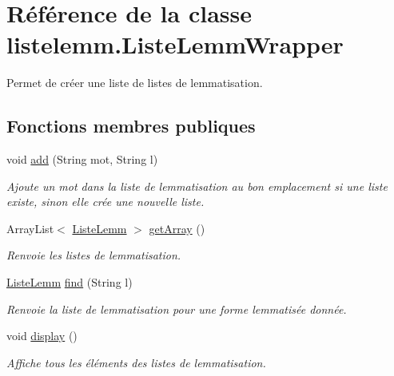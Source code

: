 \hypertarget{classlistelemm_1_1_liste_lemm_wrapper}{}\section{Référence de la classe listelemm.\+Liste\+Lemm\+Wrapper}
\label{classlistelemm_1_1_liste_lemm_wrapper}


Permet de créer une liste de listes de lemmatisation.  


\subsection*{Fonctions membres publiques}
\begin{DoxyCompactItemize}
\item 
void \hyperlink{classlistelemm_1_1_liste_lemm_wrapper_a35b6b38c162b228b18588b1bca8d7032}{add} (String mot, String l)
\begin{DoxyCompactList}\small\item\em Ajoute un mot dans la liste de lemmatisation au bon emplacement si une liste existe, sinon elle crée une nouvelle liste. \end{DoxyCompactList}\item 
Array\+List$<$ \hyperlink{classlistelemm_1_1_liste_lemm}{Liste\+Lemm} $>$ \hyperlink{classlistelemm_1_1_liste_lemm_wrapper_a51d4f2820d3582fbbe7f64581cb746dc}{get\+Array} ()
\begin{DoxyCompactList}\small\item\em Renvoie les listes de lemmatisation. \end{DoxyCompactList}\item 
\hyperlink{classlistelemm_1_1_liste_lemm}{Liste\+Lemm} \hyperlink{classlistelemm_1_1_liste_lemm_wrapper_a318131112339d774b21df28dd4d3872f}{find} (String l)
\begin{DoxyCompactList}\small\item\em Renvoie la liste de lemmatisation pour une forme lemmatisée donnée. \end{DoxyCompactList}\item 
void \hyperlink{classlistelemm_1_1_liste_lemm_wrapper_aad440ddbf1be6a330e24b791306ce812}{display} ()\hypertarget{classlistelemm_1_1_liste_lemm_wrapper_aad440ddbf1be6a330e24b791306ce812}{}\label{classlistelemm_1_1_liste_lemm_wrapper_aad440ddbf1be6a330e24b791306ce812}

\begin{DoxyCompactList}\small\item\em Affiche tous les éléments des listes de lemmatisation. \end{DoxyCompactList}\end{DoxyCompactItemize}


